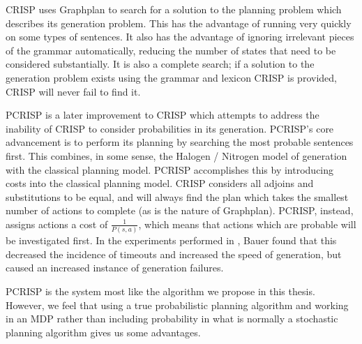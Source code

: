 CRISP uses Graphplan to search for a solution to the planning
problem which describes its generation problem.  This has
the advantage of running very quickly on some types of
sentences.  It also has the advantage of ignoring irrelevant
pieces of the grammar automatically, reducing the number
of states that need to be considered substantially.
It is also a complete search; if a solution to the generation
problem exists using the grammar and lexicon CRISP is provided,
CRISP will never fail to find it.

PCRISP \cite{bauer_sentence_2010} is a later improvement to
CRISP which attempts to address the inability of CRISP to consider
probabilities in its generation.  PCRISP's core advancement is
to perform its planning by searching the most probable sentences
first.  This combines, in some sense, the Halogen / Nitrogen model
of generation with the classical planning model.  PCRISP accomplishes
this by introducing costs into the classical planning model.
CRISP considers all adjoins and substitutions to be equal, and
will always find the plan which takes the smallest number of actions
to complete (as is the nature of Graphplan).  PCRISP, instead,
assigns actions a cost of $\frac{1}{P(s,a)}$, which means that
actions which are probable will be investigated first.  In the
experiments performed in \cite{bauer2009statistical},
Bauer found that this decreased the incidence of timeouts and
increased the speed of generation, but caused an increased instance of
generation failures.

PCRISP is the system most like the algorithm we propose in this thesis.
However, we feel that using a true probabilistic planning algorithm
and working in an MDP rather than including probability in what
is normally a stochastic planning algorithm gives us some advantages.